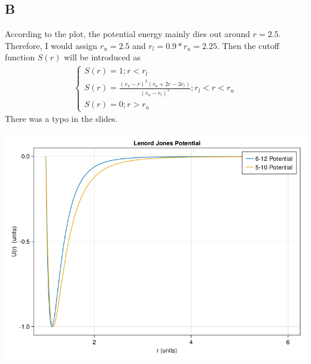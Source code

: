 \documentclass[11pt]{article}
\begin{document}
\subsection{B}
\label{sec:org710f742}
According to the plot, the potential energy mainly dies out around \(r = 2.5\).
Therefore, I would assign \(r_{u} = 2.5\) and \(r_{l} = 0.9* r_{u} = 2.25\). Then
the cutoff function \(S(r)\) will be introduced as
\begin{align}
    \begin{cases}
    S(r) = 1 ; r < r_{l} \\
    S(r) = \frac{(r_{u}-r)^2(r_{u}+2r-3r_{l})}{(r_{u}-r_{l})^3} ; r_{l} < r < r_{u} \\
    S(r) = 0; r > r_{u}
    \end{cases}
\end{align}
There was a typo in the slides.

\begin{center}
\includegraphics[width=.9\linewidth]{./p2.png}
\end{center}
\end{document}
